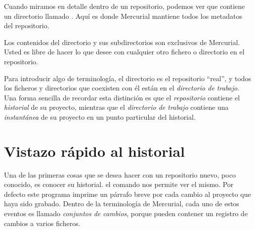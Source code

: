 Cuando miramos en detalle dentro de un repositorio, podemos ver que
contiene un directorio llamado . Aquí es donde Mercurial
mantiene todos los metadatos del repositorio.

Los contenidos del directorio  y sus subdirectorios son
exclusivos de Mercurial. Usted es libre de hacer lo que desee con
cualquier otro fichero o directorio en el repositorio.

Para introducir algo de terminología, el directorio  es
el repositorio ``real'', y todos los ficheros y directorios que
coexisten con él están en el \emph{directorio de trabajo}. Una forma
sencilla de recordar esta distinción es que el \emph{repositorio}
contiene el \emph{historial} de su proyecto, mientras que el
\emph{directorio de trabajo} contiene una \emph{instantánea} de su
proyecto en un punto particular del historial.

\section{Vistazo rápido al historial}

Una de las primeras cosas que se desea hacer con un repositorio nuevo,
poco conocido, es conocer su historial. el comando  nos
permite ver el mismo.
Por defecto este programa imprime un párrafo breve por cada cambio al
proyecto que haya sido grabado. Dentro de la terminología de
Mercurial, cada uno de estos eventos es llamado \emph{conjuntos de
cambios}, porque pueden contener un registro de cambios a varios
ficheros.

